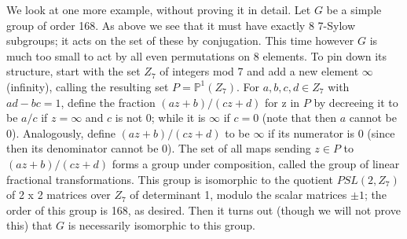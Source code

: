 \documentclass[10pt]{article} \usepackage{amsmath, amssymb}
\begin{document}
We look at one more example, without proving it in detail. Let $G$ be a
simple group of order 168. As above we see that it must have exactly 8
7-Sylow subgroups; it acts on the set of these by conjugation. This time
however $G$ is much too small to act by all even permutations on 8
elements. To pin down its structure, start with the set $Z_7$ of
integers mod 7 and add a new element $\infty$ (infinity), calling the
resulting set $P=\mathbb P^1(Z_7)$. For $a,b,c,d\in Z_7$ with $ad-bc=1$,
define the fraction $(az + b)/(cz + d)$ for z in $P$ by decreeing it to
be $a/c$ if $z=\infty$ and $c$ is not 0; while it is $\infty$ if $c=0$
(note that then $a$ cannot be 0). Analogously, define $(az+b)/(cz+d)$ to
be $\infty$ if its numerator is 0 (since then its denominator cannot be
0). The set of all maps sending $z\in P$ to $(az+b)/(cz+d)$ forms a
group under composition, called the group of linear fractional
transformations. This group is isomorphic to the quotient $PSL(2,Z_7)$
of 2 x 2 matrices over $Z_7$ of determinant 1, modulo the scalar
matrices $\pm1$; the order of this group is 168, as desired. Then it
turns out (though we will not prove this) that $G$ is necessarily
isomorphic to this group.
\end{document}
